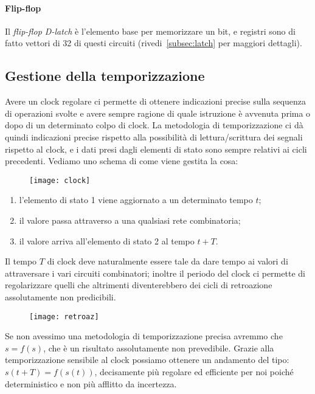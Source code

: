 \paragraph{Flip-flop}
Il \emph{flip-flop D-latch} è l’elemento base per memorizzare un bit, e registri sono di fatto vettori di 32 di questi circuiti (rivedi~\ref{subsec:latch} per maggiori dettagli).

\subsection{Gestione della temporizzazione}
Avere un clock regolare ci permette di ottenere indicazioni precise sulla sequenza di operazioni svolte e avere sempre ragione di quale istruzione è avvenuta prima o dopo di un determinato colpo di clock. La metodologia di temporizzazione ci dà quindi indicazioni precise rispetto alla possibilità di lettura/scrittura dei segnali rispetto al clock, e i dati presi dagli elementi di stato sono sempre relativi ai cicli precedenti. Vediamo uno schema di come viene gestita la cosa:
\begin{figure}[H]
	\centering
	\texttt{[image: clock]}
\end{figure}
\begin{enumerate}
	\item l'elemento di stato 1 viene aggiornato a un determinato tempo \(t\);
	\item il valore passa attraverso a una qualsiasi rete combinatoria;
	\item il valore arriva all'elemento di stato 2 al tempo \(t + T\).
\end{enumerate}
Il tempo \(T\) di clock deve naturalmente essere tale da dare tempo ai valori di attraversare i vari circuiti combinatori; inoltre il periodo del clock ci permette di regolarizzare quelli che altrimenti diventerebbero dei cicli di retroazione assolutamente non predicibili.
\begin{figure}[H]
	\centering
	\texttt{[image: retroaz]}
\end{figure}
Se non avessimo una metodologia di temporizzazione precisa avremmo che \(s = f(s)\), che è un risultato assolutamente non prevedibile. Grazie alla temporizzazione sensibile al clock possiamo ottenere un andamento del tipo: \(s(t + T) = f(s(t))\), decisamente più regolare ed efficiente per noi poiché deterministico e non più afflitto da incertezza.

